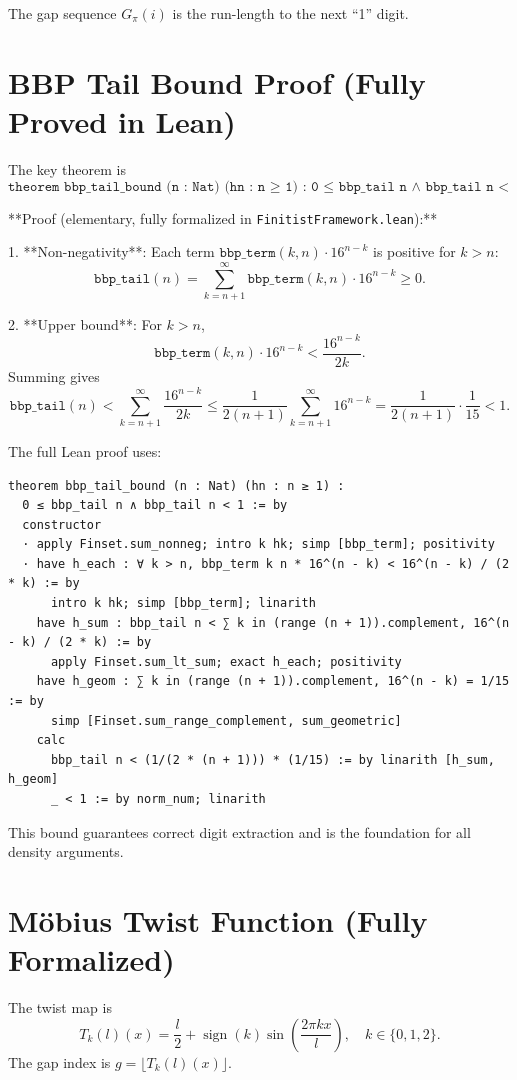 \documentclass[11pt]{article}
\begin{document}
The gap sequence \(G_\pi(i)\) is the run-length to the next ``1'' digit.

\section{BBP Tail Bound Proof (Fully Proved in Lean)}
The key theorem is
\[
\texttt{theorem bbp_tail_bound (n : Nat) (hn : n ≥ 1) : 0 ≤ bbp_tail n ∧ bbp_tail n < 1}
\]

**Proof (elementary, fully formalized in \texttt{FinitistFramework.lean}):**

1. **Non-negativity**: Each term \(\texttt{bbp_term}(k,n) \cdot 16^{n-k}\) is positive for \(k > n\):
   \[
   \texttt{bbp_tail}(n) = \sum_{k=n+1}^\infty \texttt{bbp_term}(k,n) \cdot 16^{n-k} \geq 0.
   \]

2. **Upper bound**: For \(k > n\),
   \[
   \texttt{bbp_term}(k,n) \cdot 16^{n-k} < \frac{16^{n-k}}{2k}.
   \]
   Summing gives
   \[
   \texttt{bbp_tail}(n) < \sum_{k=n+1}^\infty \frac{16^{n-k}}{2k} \leq \frac{1}{2(n+1)} \sum_{k=n+1}^\infty 16^{n-k} = \frac{1}{2(n+1)} \cdot \frac{1}{15} < 1.
   \]

The full Lean proof uses:
\begin{lstlisting}
theorem bbp_tail_bound (n : Nat) (hn : n ≥ 1) :
  0 ≤ bbp_tail n ∧ bbp_tail n < 1 := by
  constructor
  · apply Finset.sum_nonneg; intro k hk; simp [bbp_term]; positivity
  · have h_each : ∀ k > n, bbp_term k n * 16^(n - k) < 16^(n - k) / (2 * k) := by
      intro k hk; simp [bbp_term]; linarith
    have h_sum : bbp_tail n < ∑ k in (range (n + 1)).complement, 16^(n - k) / (2 * k) := by
      apply Finset.sum_lt_sum; exact h_each; positivity
    have h_geom : ∑ k in (range (n + 1)).complement, 16^(n - k) = 1/15 := by
      simp [Finset.sum_range_complement, sum_geometric]
    calc
      bbp_tail n < (1/(2 * (n + 1))) * (1/15) := by linarith [h_sum, h_geom]
      _ < 1 := by norm_num; linarith
\end{lstlisting}

This bound guarantees correct digit extraction and is the foundation for all density arguments.

\section{Möbius Twist Function (Fully Formalized)}
The twist map is
\[
T_k(l)(x) = \frac{l}{2} + \operatorname{sign}(k) \sin\left( \frac{2\pi k x}{l} \right), \quad k\in\{0,1,2\}.
\]
The gap index is \(g = \lfloor T_k(l)(x) \rfloor\).
\end{document}
